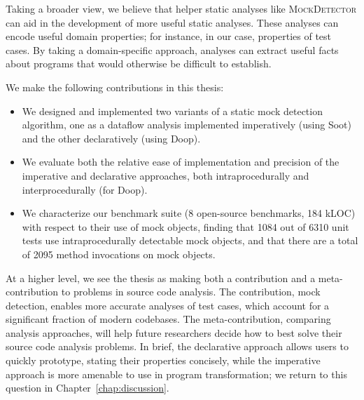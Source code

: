 Taking a broader view, we believe that helper static analyses like \textsc{MockDetector} 
can aid
in the development of more useful static analyses. These analyses can
encode useful domain properties; for instance, in our case, properties
of test cases. By taking a domain-specific approach, analyses can extract
useful facts about programs that would otherwise be difficult to establish.

We make the following contributions in this thesis:
\begin{itemize}
	\item We designed and implemented two variants of a static mock detection algorithm, one as a dataflow analysis implemented imperatively (using Soot) and the other declaratively (using Doop).
	\item We evaluate both the relative ease of implementation and precision of the imperative and declarative approaches, both intraprocedurally and interprocedurally (for Doop). %
	\item We characterize our benchmark suite (8 open-source benchmarks, 184 kLOC) with respect to their use of mock objects, finding that 1084 out of 6310 unit tests use intraprocedurally detectable mock objects, and that there are a total of 2095 method invocations on mock objects. %
\end{itemize}
At a higher level, we see the thesis as making both a contribution and a meta-contribution to
problems in source code analysis. The contribution, mock detection, enables more accurate analyses
of test cases, which account for a significant fraction of modern codebases. The meta-contribution,
comparing analysis approaches, will help future researchers decide how to best solve their
source code analysis problems. In brief, the declarative approach allows users to quickly prototype, stating their properties
concisely, while the imperative approach is more amenable to use in program transformation; we return
to this question in Chapter~\ref{chap:discussion}.